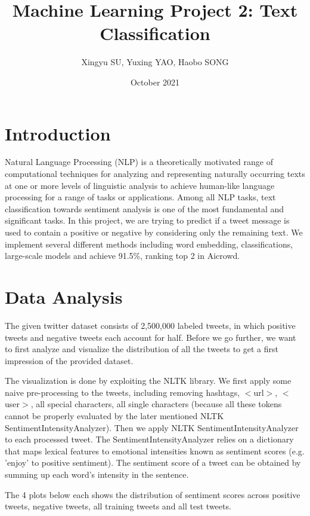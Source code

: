 \documentclass[journal]{IEEEtran}
\begin{document}
\title{Machine Learning Project 2: Text Classification}
\author{Xingyu SU, Yuxing YAO, Haobo SONG }
\date{October 2021}
\maketitle

\section{Introduction}
Natural Language Processing (NLP) is a theoretically motivated range of
computational techniques for analyzing and representing naturally occurring texts at one or more levels of linguistic analysis to achieve human-like language processing for a range of tasks or applications. \cite{nlp} Among all NLP tasks, text classification towards sentiment analysis is one of the most fundamental and significant tasks. In this project, we are trying to predict if a tweet message is used to contain a positive or negative by considering only the remaining text. We implement several different methods including word embedding, classifications, large-scale models and achieve 91.5\%, ranking top 2 in Aicrowd.

\section{Data Analysis}
The given twitter dataset consists of 2,500,000 labeled tweets, in which positive tweets and negative tweets each account for half. Before we go further, we want to first analyze and visualize the distribution of all the tweets to get a first impression of the provided dataset.

The visualization is done by exploiting the NLTK library. We first apply some naive pre-processing to the tweets, including removing hashtags, $<$url$>$, $<$user$>$, all special characters, all single characters (because all these tokens cannot be properly evaluated by the later mentioned NLTK SentimentIntensityAnalyzer). Then we apply NLTK SentimentIntensityAnalyzer to each processed tweet. The SentimentIntensityAnalyzer relies on a dictionary that maps lexical features to emotional intensities known as sentiment scores (e.g. 'enjoy' to positive sentiment). The sentiment score of a tweet can be obtained by summing up each word's intensity in the sentence.

The 4 plots below each shows the distribution of sentiment scores across positive tweets, negative tweets, all training tweets and all test tweets.
\end{document}
